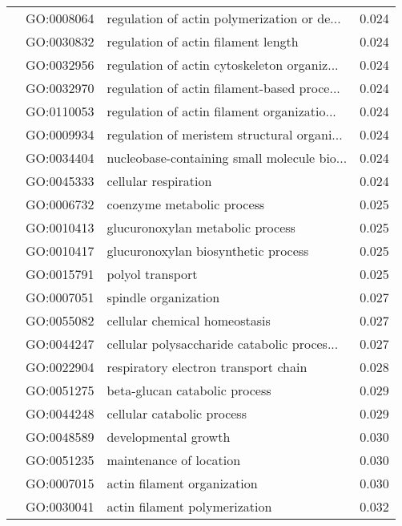 \begin{longtable}{lllr}
   & GO:0008064 &  regulation of actin polymerization or de... &         0.024 \\
   & GO:0030832 &          regulation of actin filament length &         0.024 \\
   & GO:0032956 &  regulation of actin cytoskeleton organiz... &         0.024 \\
   & GO:0032970 &  regulation of actin filament-based proce... &         0.024 \\
   & GO:0110053 &  regulation of actin filament organizatio... &         0.024 \\
   & GO:0009934 &  regulation of meristem structural organi... &         0.024 \\
   & GO:0034404 &  nucleobase-containing small molecule bio... &         0.024 \\
   & GO:0045333 &                         cellular respiration &         0.024 \\
   & GO:0006732 &                   coenzyme metabolic process &         0.025 \\
   & GO:0010413 &             glucuronoxylan metabolic process &         0.025 \\
   & GO:0010417 &          glucuronoxylan biosynthetic process &         0.025 \\
   & GO:0015791 &                             polyol transport &         0.025 \\
   & GO:0007051 &                         spindle organization &         0.027 \\
   & GO:0055082 &                cellular chemical homeostasis &         0.027 \\
   & GO:0044247 &  cellular polysaccharide catabolic proces... &         0.027 \\
   & GO:0022904 &         respiratory electron transport chain &         0.028 \\
   & GO:0051275 &                beta-glucan catabolic process &         0.029 \\
   & GO:0044248 &                   cellular catabolic process &         0.029 \\
   & GO:0048589 &                         developmental growth &         0.030 \\
   & GO:0051235 &                      maintenance of location &         0.030 \\
   & GO:0007015 &                  actin filament organization &         0.030 \\
   & GO:0030041 &                actin filament polymerization &         0.032 \\

\end{longtable}
